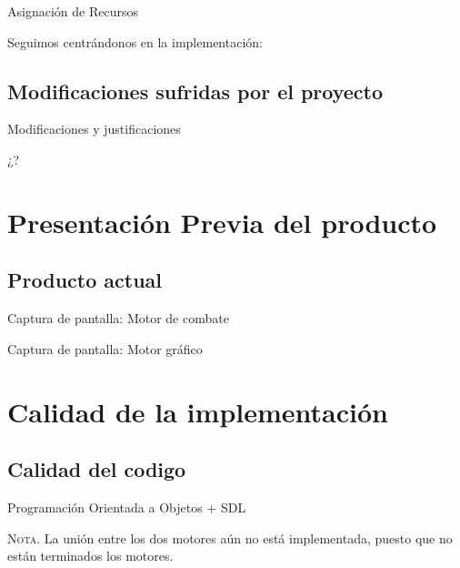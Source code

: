 \documentclass[9pt,xcolor=svgnames]{beamer}
\begin{document}
  
  \begin{frame}{Asignación de Recursos}
   
   Seguimos centrándonos en la implementación:
   
    
  \end{frame}
   
   
   
   \subsection{Modificaciones sufridas por el proyecto}
   
   \begin{frame}{Modificaciones y justificaciones}
    
    ¿?
    
    
   \end{frame}
   
   
 \section{Presentación Previa del producto}
 
   \subsection{Producto actual}

   \begin{frame}{Captura de pantalla: Motor de combate}
    
   \end{frame}


   \begin{frame}{Captura de pantalla: Motor gráfico}
    
   \end{frame}



 \section{Calidad de la implementación}
 
  \subsection{Calidad del codigo}
  
  \begin{frame}{Programación Orientada a Objetos + SDL}   
   
   
   \textsc{Nota.} La unión entre los dos motores aún no está
   implementada, puesto que no están terminados los motores.

  \end{frame}
  
\end{document}
